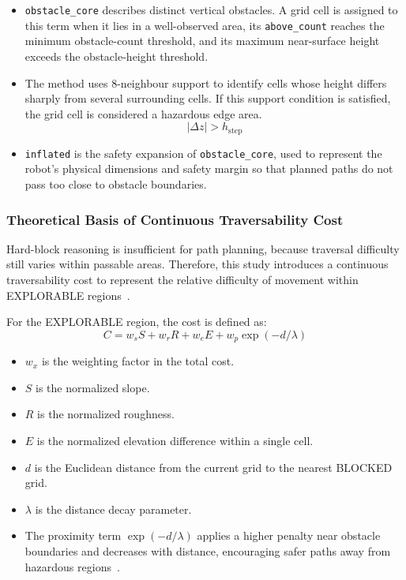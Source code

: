 \documentclass[12pt]{interim_report}
\begin{document}
\begin{itemize}
    \item \texttt{obstacle\_core} describes distinct vertical obstacles. A grid cell is assigned to this term when it lies in a well-observed area, its \texttt{above\_count} reaches the minimum obstacle-count threshold, and its maximum near-surface height exceeds the obstacle-height threshold.

    \item The method uses 8-neighbour support to identify cells whose height differs sharply from several surrounding cells. If this support condition is satisfied, the grid cell is considered a hazardous edge area.
    \begin{equation}
        |\Delta z| > h_{\mathrm{step}}
    \end{equation}

    \item \texttt{inflated} is the safety expansion of \texttt{obstacle\_core}, used to represent the robot's physical dimensions and safety margin so that planned paths do not pass too close to obstacle boundaries.
\end{itemize}

\subsubsection{Theoretical Basis of Continuous Traversability Cost}
\label{subsec:chizou-continuous-cost}

Hard-block reasoning is insufficient for path planning, because traversal difficulty still varies within passable areas. Therefore, this study introduces a continuous traversability cost to represent the relative difficulty of movement within EXPLORABLE regions~\cite{carvalho2024traversability}.

For the EXPLORABLE region, the cost is defined as:
\begin{equation}
    C = w_s S + w_r R + w_e E + w_p \exp(-d/\lambda)
\end{equation}

\begin{itemize}
    \item $w_x$ is the weighting factor in the total cost.
    \item $S$ is the normalized slope.
    \item $R$ is the normalized roughness.
    \item $E$ is the normalized elevation difference within a single cell.
    \item $d$ is the Euclidean distance from the current grid to the nearest BLOCKED grid.
    \item $\lambda$ is the distance decay parameter.
    \item The proximity term $\exp(-d/\lambda)$ applies a higher penalty near obstacle boundaries and decreases with distance, encouraging safer paths away from hazardous regions~\cite{chen2022gpu}.
\end{itemize}
\end{document}
